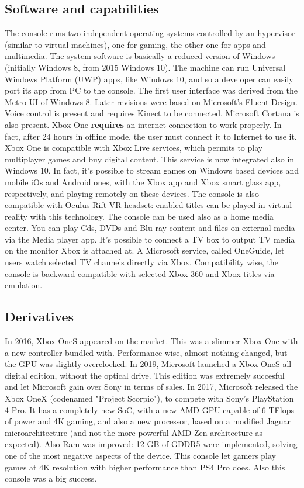\documentclass[a4paper,10pt]{book}
\begin{document}
 \subsection{ Software and capabilities  }
  The console runs two independent operating systems controlled by an hypervisor (similar to virtual machines), one for gaming, the other one for apps and multimedia. The system software is basically a reduced version of Windows (initially Windows 8, from 2015 Windows 10). The machine can run Universal Windows Platform (UWP) apps, like Windows 10, and so a developer can easily port its app from PC to the console.  
  The first user interface was derived from the Metro UI of Windows 8. Later revisions were based on Microsoft's Fluent Design. Voice control is present and requires Kinect to be connected. Microsoft Cortana is also present.  
  Xbox One  \textbf{ requires  }  an internet connection to work properly. In fact, after 24 hours in offline mode, the user must connect it to Internet to use it.  
  Xbox One is compatible with Xbox Live services, which permits to play multiplayer games and buy digital content. This service is now integrated also in Windows 10.  
  In fact, it's possible to stream games on Windows based devices and mobile iOs and Android ones, with the Xbox app and Xbox smart glass app, respectively, and playing remotely on these devices.  
  The console is also compatible with Oculus Rift VR headset: enabled titles can be played in virtual reality with this technology.  
  The console can be used also as a home media center. You can play Cds, DVDs and Blu-ray content and files on external media via the Media player app. It's possible to connect a TV box to output TV media on the monitor Xbox is attached at. A Microsoft service, called OneGuide, let users watch selected TV channels directly via Xbox.  
  Compatibility wise, the console is backward compatible with selected Xbox 360 and Xbox titles via emulation.  
 \subsection{ Derivatives  }
  In 2016, Xbox OneS appeared on the market. This was a slimmer Xbox One with a new controller bundled with. Performance wise, almost nothing changed, but the GPU was slightly overclocked.  
  In 2019, Microsoft launched a Xbox OneS all-digital edition, without the optical drive. This edition was extremely succesful and let Microsoft gain over Sony in terms of sales.  
  In 2017, Microsoft released the Xbox OneX (codenamed "Project Scorpio"), to compete with Sony's PlayStation 4 Pro. It has a completely new SoC, with a new AMD GPU capable of 6 TFlops of power and 4K gaming, and also a new processor, based on a modified Jaguar microarchitecture (and not the more powerful AMD Zen architecture as expected). Also Ram was improved: 12 GB of GDDR5 were implemented, solving one of the most negative aspects of the device. This console let gamers play games at 4K resolution with higher performance than PS4 Pro does. Also this console was a big success.  
\end{document}
